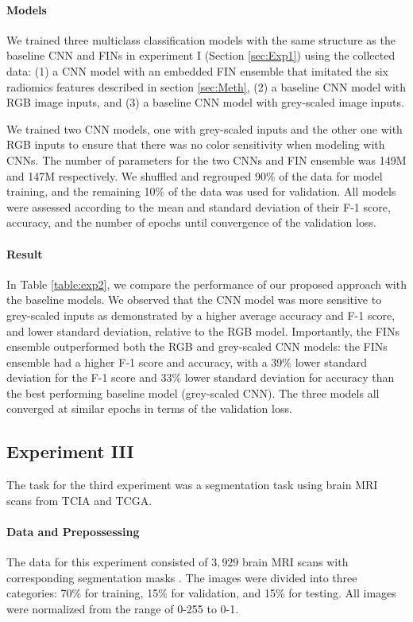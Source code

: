 \documentclass[conference]{IEEEtran}
\begin{document}
\paragraph*{Models} We trained three multiclass classification models with the same structure as the baseline CNN and FINs in experiment I (Section \ref{sec:Exp1}) using the collected data: (1) a CNN model with an embedded FIN ensemble that imitated the six radiomics features described in section \ref{sec:Meth}, (2) a baseline CNN model with RGB image inputs, and (3) a baseline CNN model with grey-scaled image inputs. 

We trained two CNN models, one with grey-scaled inputs and the other one with RGB inputs to ensure that there was no color sensitivity when modeling with CNNs. The number of parameters for the two CNNs and FIN ensemble was 149M and 147M respectively. We shuffled and regrouped 90\% of the data for model training, and the remaining 10\% of the data was used for validation. All models were assessed according to the mean and standard deviation of their F-1 score, accuracy, and the number of epochs until convergence of the validation loss. 


\paragraph*{Result} In Table \ref{table:exp2}, we compare the performance of our proposed approach with the baseline models. We observed that the CNN model was more sensitive to grey-scaled inputs as demonstrated by a higher average accuracy and F-1 score, and lower standard deviation, relative to the RGB model. Importantly, the FINs ensemble outperformed both the RGB and grey-scaled CNN models: the FINs ensemble had a higher F-1 score and accuracy, with a 39\% lower standard deviation for the F-1 score and 33\% lower standard deviation for accuracy than the best performing baseline model (grey-scaled CNN). The three models all converged at similar epochs in terms of the validation loss.

\subsection{Experiment III} \label{sec:Exp3}
The task for the third experiment was a segmentation task using brain MRI scans from TCIA and TCGA.


\paragraph*{Data and Prepossessing} The data for this experiment consisted of $3,929$ brain MRI scans with corresponding segmentation masks \cite{brainMRI}. The images were divided into three categories: 70\% for training, 15\% for validation, and 15\% for testing. All images were normalized from the range of 0-255 to 0-1.
\end{document}

